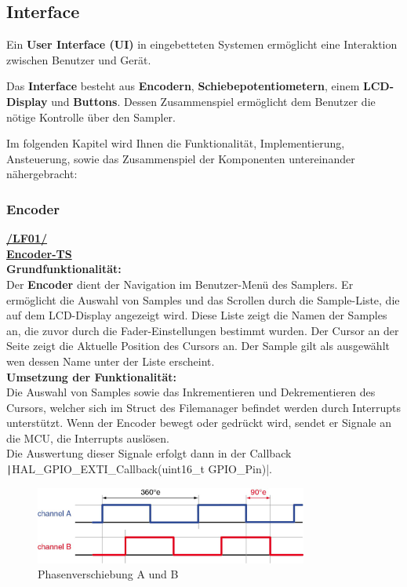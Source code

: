 \subsection{Interface}\label{sec:interface}

Ein\textbf{ User Interface (UI)} in eingebetteten Systemen ermöglicht eine Interaktion zwischen Benutzer und Gerät.

Das \textbf{Interface} besteht aus \textbf{Encodern}, \textbf{Schiebepotentiometern}, einem \textbf{LCD-Display }und \textbf{Buttons}. Dessen Zusammenspiel ermöglicht dem Benutzer die nötige Kontrolle über den Sampler.


Im folgenden Kapitel wird Ihnen die Funktionalität, Implementierung, Ansteuerung, sowie das Zusammenspiel der Komponenten untereinander nähergebracht: 

\subsubsection{Encoder}
\textbf{\hyperlink{LF01_Link}{/LF01/}} \\
\textbf{\hyperlink{Encoder}{Encoder-TS}} \\
\textbf{Grundfunktionalität:} \\


Der \textbf{Encoder} dient der Navigation im Benutzer-Menü des Samplers. Er ermöglicht die Auswahl von Samples und das Scrollen durch die Sample-Liste, die auf dem LCD-Display angezeigt wird. Diese Liste zeigt die Namen der Samples an, die zuvor durch die Fader-Einstellungen bestimmt wurden. Der Cursor an der Seite zeigt die Aktuelle Position des Cursors an. Der Sample gilt als ausgewählt wen dessen Name unter der Liste erscheint.\\

\textbf{Umsetzung der Funktionalität:} \\

Die Auswahl von Samples sowie das Inkrementieren und Dekrementieren des Cursors, welcher sich im Struct des Filemanager befindet werden durch Interrupts unterstützt. Wenn der Encoder bewegt oder gedrückt wird, sendet er Signale an die MCU, die Interrupts auslösen.\\

Die Auswertung dieser Signale erfolgt dann in der Callback  \texttt|HAL_GPIO_EXTI_Callback(uint16_t GPIO_Pin)|. 

\begin{figure}[H]
	\centering
	\includegraphics[width=0.8\textwidth]{images/08_durchfuehrung/interface/encoder.png}
	\caption{Phasenverschiebung A und B}
	\label{fig:phase_verschiebung}
\end{figure}

